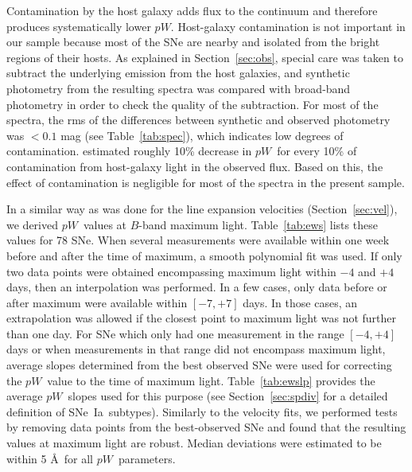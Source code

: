 \documentclass[apj]{emulateapj-rtx4}
\newcommand{\ew}{$pW$}
\newcommand{\sneia}{SNe~Ia}
\begin{document}
Contamination by the host galaxy adds flux to the continuum and
therefore produces systematically lower \ew. Host-galaxy
contamination is not important in our sample because most of the SNe
are nearby and isolated from the bright regions of their hosts. As
explained in Section~\ref{sec:obs}, special care was taken to subtract
the underlying emission from the host galaxies, and synthetic
photometry from the resulting spectra was compared with
broad-band photometry in order to check the quality of the
subtraction. For most of the spectra, the rms of the 
differences between synthetic and observed photometry was $<0.1$
mag (see Table~\ref{tab:spec}), which indicates low degrees of
contamination. \citet{garavini07} estimated roughly 10\% decrease in
\ew\ for every 10\% of contamination from host-galaxy light in the
observed flux. Based on this, the effect of contamination is
negligible for most of the spectra in the present sample. 

In a similar way as was done for the line expansion velocities
(Section~\ref{sec:vel}), we derived \ew\ values at $B$-band maximum
light. Table~\ref{tab:ews} lists these values for 78 SNe. When several
measurements were available within one week before 
and after the time of maximum, a smooth polynomial fit was used. If
only two data points were obtained encompassing maximum light within
$-4$ and $+4$ days, then an interpolation was performed. In a few
cases, only data before or after maximum were available within
$[-7,+7]$ days. In those cases, an extrapolation was allowed if the
closest point to maximum light was not further than one day. For SNe
which only had one measurement in the range $[-4,+4]$ days or when
measurements in that range did not encompass maximum light, average
slopes determined from the best observed SNe were used for correcting
the \ew\ value to the time of maximum light. Table~\ref{tab:ewslp}
provides the average \ew\ slopes used for this purpose (see
Section~\ref{sec:spdiv} for a detailed definition of
\sneia\ subtypes). Similarly to the velocity fits, we performed tests
by removing data points from the best-observed SNe and found that the
resulting values at maximum light are robust. Median deviations were
estimated to be within 5 \AA\ for all \ew\ parameters.
\end{document}
